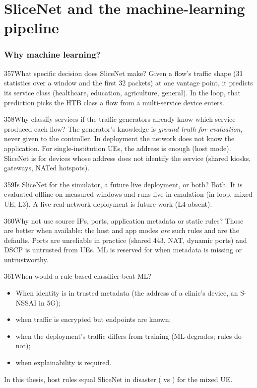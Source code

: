 \part{SliceNet and the machine-learning pipeline}

\FigSliceNet

\section{Why machine learning?}

\begin{qa}{357}{What specific decision does SliceNet make?}
Given a flow's traffic shape (31 statistics over a window and the first 32 packets) at one vantage point, it predicts
its service class (healthcare, education, agriculture, general). In the loop, that prediction picks the HTB class a
flow from a multi-service device enters.
\end{qa}

\begin{qa}{358}{Why classify services if the traffic generators already know which service produced each flow?}
The generator's knowledge is \emph{ground truth for evaluation}, never given to the controller. In deployment the
network does not know the application. For single-institution UEs, the address is enough (host mode). SliceNet is for
devices whose address does not identify the service (shared kiosks, gateways, NATed hotspots).
\end{qa}

\begin{qa}{359}{Is SliceNet for the simulator, a future live deployment, or both?}
Both. It is evaluated offline on measured windows and runs live in emulation (in-loop, mixed UE, L3). A live real-network
deployment is future work (L4 absent).
\end{qa}

\begin{qa}{360}{Why not use source IPs, ports, application metadata or static rules?}
Those are better when available: the host and app modes \emph{are} such rules and are the defaults. Ports are
unreliable in practice (shared 443, NAT, dynamic ports) and DSCP is untrusted from UEs. ML is reserved for when
metadata is missing or untrustworthy.
\end{qa}

\begin{qa}{361}{When would a rule-based classifier beat ML?}
\begin{itemize}
\item When identity is in trusted metadata (the address of a clinic's device, an S-NSSAI in 5G);
\item when traffic is encrypted but endpoints are known;
\item when the deployment's traffic differs from training (ML degrades; rules do not);
\item when explainability is required.
\end{itemize}
In this thesis, host rules equal SliceNet in disaster (\NMixedDisasterHostSla{} vs \NMixedDisasterSlicenetSla) for the
mixed UE.
\end{qa}

